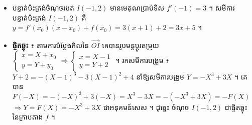 \begin{itemize}
  នាំឱ្យ $x = 1$ ឬ $x = -2$ ។
  \item បន្ទាត់ប៉ះត្រង់ចំណុចរបត់ $I(-1, 2)$ មានមេគុណប្រាប់ទិស $f'(-1) = 3$ ។ សមីការបន្ទាត់ប៉ះត្រង់ $I(-1, 2)$ គឺ $y = f'(x_0)(x - x_0) + f(x_0) = 3(x + 1) + 2 = 3x + 5$ ។
  \item \textbf{ផ្ចិតឆ្លុះ} ៖ តាមការបំប្លែងកិលនៃ $\overrightarrow{OI}$ គេបានរូបមន្តប្ដូរតម្រុយ $\begin{cases} x = X + x_0\\ y = Y + y_0 \end{cases} \Rightarrow \begin{cases} x = X - 1\\ y = Y + 2 \end{cases}$ ។ រកសមីការបង្រួម ៖ $Y + 2 = -(X - 1)^3 - 3(X - 1)^2 + 4$ នាំឱ្យសមីការបង្រួម $Y = -X^3 + 3X$ ។ គេបាន $F(-X) = -(-X)^3 + 3(-X) = X^3 - 3X = -(-X^3 + 3X) = -F(X)$ $\Rightarrow Y = F(X) = -X^3 + 3X$ ជាអនុគមន៍សេស ។ ដូច្នេះ ចំណុច $I(-1, 2)$ ជាផ្ចិតឆ្លុះនៃក្រាបតាង $f$ ។
\end{itemize}

\begin{center}
\end{center}

